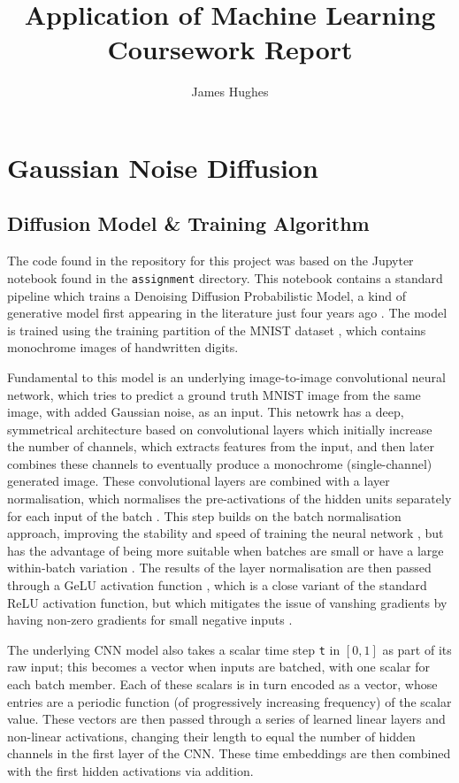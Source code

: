 \documentclass[12pt]{article}
\title{Application of Machine Learning Coursework Report}
\author{James Hughes}
\begin{document}
\maketitle

\newpage

\tableofcontents

\newpage

\section{Gaussian Noise Diffusion}
\subsection{Diffusion Model \& Training Algorithm}
The code found in the repository for this project was based on the Jupyter notebook found in the \texttt{assignment} directory.
This notebook contains a standard pipeline which trains a Denoising Diffusion Probabilistic Model,
a kind of generative model first appearing in the literature just four years ago \cite{ho2020denoising}.
The model is trained using the training partition of the MNIST dataset \cite{mnist}, which contains monochrome images of handwritten digits.

Fundamental to this model is an underlying image-to-image convolutional neural network,
which tries to predict a ground truth MNIST image from the same image, with added Gaussian noise, as an input.
This netowrk has a deep, symmetrical architecture based on convolutional layers which initially increase the number of channels,
which extracts features from the input, and then later combines these channels to eventually produce a monochrome (single-channel) generated image.
These convolutional layers are combined with a layer normalisation,
which normalises the pre-activations of the hidden units separately for each input of the batch \cite{ba2016layer}.
This step builds on the batch normalisation approach, improving the stability and speed of training the neural network \cite{ba2016layer},
but has the advantage of being more suitable when batches are small or have a large within-batch variation \cite{prince2023understanding}.
The results of the layer normalisation are then passed through a GeLU activation function \cite{hendrycks2023gaussian},
which is a close variant of the standard ReLU activation function,
but which mitigates the issue of vanshing gradients by having non-zero gradients for small negative inputs \cite{nguyen2021analysis}.

The underlying CNN model also takes a scalar time step \texttt{t} in $[0,1]$ as part of its raw input; this becomes a vector when inputs are batched,
with one scalar for each batch member.
Each of these scalars is in turn encoded as a vector, whose entries are a periodic function (of progressively increasing frequency)
of the scalar value.
These vectors are then passed through a series of learned linear layers and non-linear activations,
changing their length to equal the number of hidden channels in the first layer of the CNN.
These time embeddings are then combined with the first hidden activations via addition.
\end{document}
